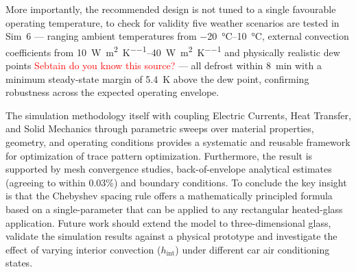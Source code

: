 


More importantly, the recommended design is not tuned to a 
single favourable operating temperature, to check for validity five weather scenarios are tested in Sim~6 --- ranging ambient 
temperatures from \SIrange{-20}{10}{\celsius}, external convection coefficients from 
\SIrange{10}{40}{\watt\per\metre\squared\per\kelvin} and physically realistic dew points 
\textcolor{red}{Sebtain do you know this source?}
\cite{lawrence2005} --- all defrost within \SI{8}{\minute} with a minimum steady-state 
margin of \SI{+5.4}{\kelvin} above the dew point, confirming robustness across the expected 
operating envelope.

The simulation methodology itself with coupling Electric Currents, Heat Transfer, and Solid 
Mechanics through parametric sweeps over material properties, geometry, and operating 
conditions provides a systematic and reusable framework for optimization of trace pattern optimization. 
Furthermore, the result is supported by mesh convergence studies, back-of-envelope 
analytical estimates (agreeing to within 0.03\%) and boundary conditions. 
To conclude the key insight is that the Chebyshev spacing 
rule offers a mathematically principled formula based on a single-parameter that can be 
applied to any rectangular heated-glass application. Future work should extend the model 
to three-dimensional glass, validate the simulation results against a physical 
prototype and investigate the effect of varying interior convection ($h_\text{int}$) 
under different car air conditioning states.
